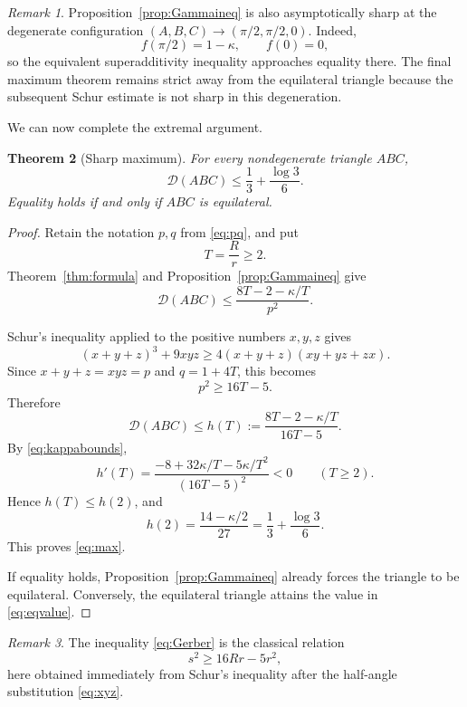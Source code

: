 \documentclass[11pt]{article}
\newtheorem{theorem}{Theorem}[section]
\theoremstyle{definition}
\theoremstyle{remark}
\newtheorem{remark}[theorem]{Remark}
\begin{document}
\begin{remark}
Proposition~\ref{prop:Gammaineq} is also asymptotically sharp at the degenerate configuration $(A,B,C)\to(\pi/2,\pi/2,0)$.  Indeed,
\[
f(\pi/2)=1-\kappa,
\qquad
f(0)=0,
\]
so the equivalent superadditivity inequality approaches equality there.  The final maximum theorem remains strict away from the equilateral triangle because the subsequent Schur estimate is not sharp in this degeneration.
\end{remark}

We can now complete the extremal argument.

\begin{theorem}[Sharp maximum]
\label{thm:max}
For every nondegenerate triangle $ABC$,
\begin{equation}
\label{eq:max}
\boxed{
\mathcal D(ABC)
\le
\frac13+\frac{\log3}{6}.
}
\end{equation}
Equality holds if and only if $ABC$ is equilateral.
\end{theorem}

\begin{proof}
Retain the notation $p,q$ from \eqref{eq:pq}, and put
\[
T=\frac Rr\ge2.
\]
Theorem~\ref{thm:formula} and Proposition~\ref{prop:Gammaineq} give
\begin{equation}
\label{eq:firstbound}
\mathcal D(ABC)
\le
\frac{8T-2-\kappa/T}{p^2}.
\end{equation}

Schur's inequality applied to the positive numbers $x,y,z$ gives
\[
(x+y+z)^3+9xyz
\ge
4(x+y+z)(xy+yz+zx).
\]
Since $x+y+z=xyz=p$ and $q=1+4T$, this becomes
\begin{equation}
\label{eq:Gerber}
p^2\ge16T-5.
\end{equation}
Therefore
\begin{equation}
\label{eq:hT}
\mathcal D(ABC)
\le
h(T):=
\frac{8T-2-\kappa/T}{16T-5}.
\end{equation}
By \eqref{eq:kappabounds},
\[
h'(T)
=
\frac{-8+32\kappa/T-5\kappa/T^2}{(16T-5)^2}<0
\qquad(T\ge2).
\]
Hence $h(T)\le h(2)$, and
\[
h(2)
=
\frac{14-\kappa/2}{27}
=
\frac13+\frac{\log3}{6}.
\]
This proves \eqref{eq:max}.

If equality holds, Proposition~\ref{prop:Gammaineq} already forces the triangle to be equilateral.  Conversely, the equilateral triangle attains the value in \eqref{eq:eqvalue}.
\end{proof}

\begin{remark}
The inequality \eqref{eq:Gerber} is the classical relation
\[
s^2\ge16Rr-5r^2,
\]
here obtained immediately from Schur's inequality after the half-angle substitution \eqref{eq:xyz}.
\end{remark}
\end{document}
